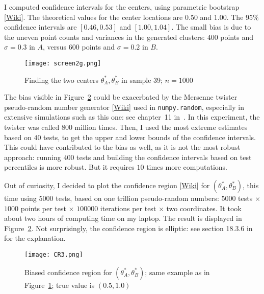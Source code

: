 \documentclass[oneside,10pt]{book}
\begin{document}
I computed confidence intervals for the centers, using \textcolor{index}{parametric bootstrap} [\href{https://en.wikipedia.org/wiki/Bootstrapping_(statistics)#Parametric_bootstrap}{Wiki}]. The theoretical values for the center
 locations are $0.50$ and $1.00$. The $95\%$ confidence intervals are $[0.46,0.53]$ and $[1.00, 1.04]$. The small bias is due to the uneven point counts and variances in the generated clusters: $400$ points and $\sigma=0.3$ in $A$, versus $600$ points and $\sigma=0.2$ in $B$.

\begin{figure}%
\centering
\texttt{[image: screen2g.png]}
\caption{Finding the two centers $\theta_A^*, \theta_B^*$ in sample 39; $n=1000$}
\label{fig:screen2}
\end{figure}

The bias visible in Figure~\ref{fig:cr} could be exacerbated by the
\textcolor{index}{Mersenne twister} pseudo-random number generator [\href{https://en.wikipedia.org/wiki/Mersenne_Twister}{Wiki}] used in \texttt{numpy.random}, especially in extensive simulations such as this one:
 see chapter~11 in~\cite{vgelsevier}. In this experiment, the twister was called $800$ million times.  Then, I used the most extreme estimates based on $40$ tests, to get the upper and lower bounds of the confidence intervals. This could have contributed to the bias as well, as it is not the most robust approach: running $400$ tests and building the confidence intervals based on test percentiles is more robust. But it requires $10$ times more computations.

Out of curiosity, I decided to plot the \textcolor{index}{confidence region} [\href{https://en.wikipedia.org/wiki/Confidence_region}{Wiki}] for $(\theta_A^*,\theta_B^*)$, this time using $\num{5000}$ tests,
 based on one trillion \textcolor{index}{pseudo-random numbers}: $\num{5000}$ tests $\times$ $1000$ points per test $\times$ $\num{100000}$ iterations per test $\times$ two
 coordinates. It took about two hours of computing time on my laptop. The result is displayed in Figure~\ref{fig:cr}. Not surprisingly, the confidence
 region is elliptic: see section 18.3.6 in~\cite{vgelsevier} for the explanation.

\begin{figure}[H]
\centering
\texttt{[image: CR3.png]}
\caption{Biased confidence region for $(\theta_A^*,\theta_B^*)$;  same example as in Figure~\ref{fig:screen2}; true value is $(0.5,1.0)$}
\label{fig:cr}
\end{figure}
\end{document}
